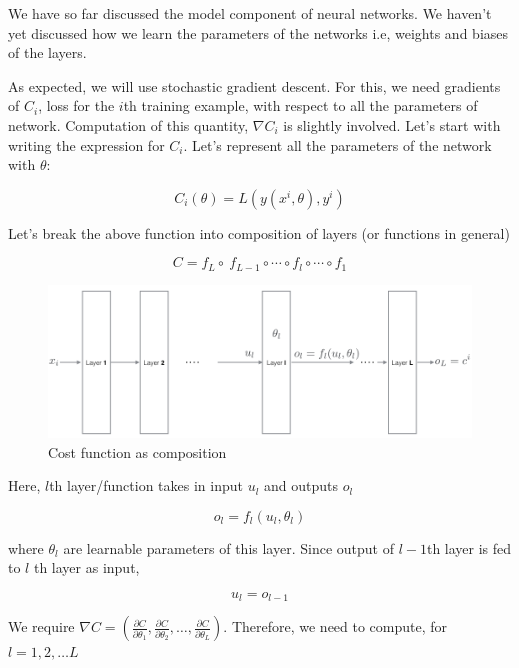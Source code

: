 \documentclass[a4paper]{tufte-handout}
\begin{document}
We have so far discussed the model component of neural networks. We
haven't yet discussed how we learn the parameters of the networks 
i.e, weights and biases of the layers.

As expected, we will use stochastic gradient descent. For this, we need
gradients of \(C_i\), loss for the \(i\)th training example,  
with respect to all the parameters of network. Computation
of this quantity, \(\nabla C_i\) is slightly involved. Let's start with
writing the expression for \(C_i\). Let's represent all the parameters
of the network with \(\theta\):

\[ C_i(\theta) = L\left(y(x^i, \theta), y^i \right)\]

Let's break the above function into composition of layers (or functions
in general)

\[ C = f_L \circ \ f_{L-1} \circ \cdots \circ f_l \circ \cdots \circ f_1 \]

\begin{figure}
  \includegraphics[width=\linewidth]{backprop.png}
  \caption{Cost function as composition}
\end{figure}


Here, \(l\)th  layer/function takes in input
\(u_l\) and outputs \(o_l\)

\begin{equation}
o_l = f_l(u_l, \theta_l) \label{eq:1}
\end{equation}


where \(\theta_l\) are learnable parameters of this layer. Since output
of \(l-1\)th layer is fed to \(l\) th layer as input,


\begin{equation}
u_l = o_{l-1} \label{eq:2}
\end{equation}


We require
\(\nabla C = \left(\frac{\partial C}{\partial\theta_1}, \frac{\partial C}{\partial\theta_2}, \ldots, \frac{\partial C}{\partial\theta_L}\right)\).
Therefore, we need to compute, for  \( l = 1, 2, \dots L \)
\end{document}
